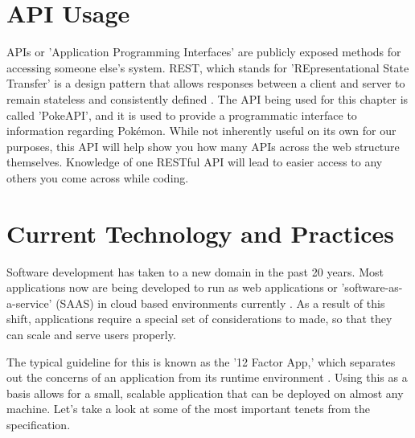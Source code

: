 \documentclass[12pt, oneside, a4paper]{book}
\begin{document}
      \section{API Usage}
      APIs or 'Application Programming Interfaces' are publicly exposed methods for accessing someone else's system.
      REST, which stands for 'REpresentational State Transfer' is a design pattern that allows responses between a client and server to remain stateless and consistently defined \autocite{hallettPokeAPI}.
      The API being used for this chapter is called 'PokeAPI', and it is used to provide a programmatic interface to information regarding Pokémon.
      While not inherently useful on its own for our purposes, this API will help show you how many APIs across the web structure themselves.
      Knowledge of one RESTful API will lead to easier access to any others you come across while coding.

      \section{Current Technology and Practices}
      Software development has taken to a new domain in the past 20 years.
      Most applications now are being developed to run as web applications or 'software-as-a-service' (SAAS) in cloud based environments currently \autocite{WhatCloudComputing}.
      As a result of this shift, applications require a special set of considerations to made, so that they can scale and serve users properly.

      The typical guideline for this is known as the '12 Factor App\footnotemark,' which separates out the concerns of an application from its runtime environment \autocite{wigginsTwelveFactorApp2017}.
      Using this as a basis allows for a small, scalable application that can be deployed on almost any machine.
      Let's take a look at some of the most important tenets from the specification.


\newpage
{}
\printbibliography[title={Works Cited},heading=bibintoc]
\end{document}

